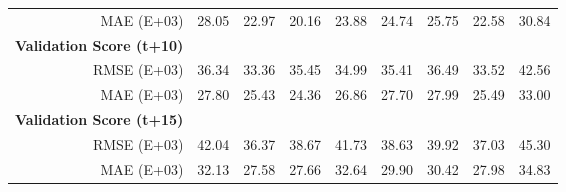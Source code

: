\begin{table}[htbp]
\begin{tabular}{cr|cccccccc}
          & MAE (E+03) & 28.05 & 22.97 & 20.16 & 23.88 & 24.74 & 25.75 & 22.58 & 30.84 \\
    \multicolumn{2}{l|}{\textbf{Validation Score (t+10)}} &       &       &       &       &       &       &       &  \\
          & RMSE (E+03) & 36.34 & 33.36 & 35.45 & 34.99 & 35.41 & 36.49 & 33.52 & 42.56 \\
          & MAE (E+03) & 27.80 & 25.43 & 24.36 & 26.86 & 27.70 & 27.99 & 25.49 & 33.00 \\
    \multicolumn{2}{l|}{\textbf{Validation Score (t+15)}} &       &       &       &       &       &       &       &  \\
          & RMSE (E+03) & 42.04 & 36.37 & 38.67 & 41.73 & 38.63 & 39.92 & 37.03 & 45.30 \\
          & MAE (E+03) & 32.13 & 27.58 & 27.66 & 32.64 & 29.90 & 30.42 & 27.98 & 34.83 \\
    \end{tabular}%
  \label{table4}%
\end{table}%




